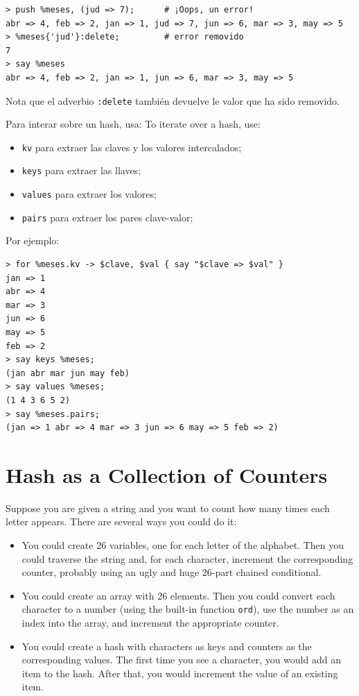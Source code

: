 \begin{verbatim}
> push %meses, (jud => 7);      # ¡Oops, un error!
abr => 4, feb => 2, jan => 1, jud => 7, jun => 6, mar => 3, may => 5
> %meses{'jud'}:delete;         # error removido
7
> say %meses
abr => 4, feb => 2, jan => 1, jun => 6, mar => 3, may => 5
\end{verbatim}

Nota que el adverbio {\tt :delete} también devuelve le valor que
ha sido removido.

Para interar sobre un hash, usa:
To iterate over a hash, use:

\begin{itemize}
\item {\tt kv} para extraer las claves y los valores intercalados;
\item {\tt keys} para extraer las llaves;
\item {\tt values} para extraer los valores;
\item {\tt pairs} para extraer los pares clave-valor;
\end{itemize}

Por ejemplo:

\begin{verbatim}
> for %meses.kv -> $clave, $val { say "$clave => $val" }
jan => 1
abr => 4
mar => 3
jun => 6
may => 5
feb => 2
> say keys %meses;
(jan abr mar jun may feb)
> say values %meses;
(1 4 3 6 5 2)
> say %meses.pairs;
(jan => 1 abr => 4 mar => 3 jun => 6 may => 5 feb => 2)
\end{verbatim}
%

\section{Hash as a Collection of Counters}
\label{histogram}

Suppose you are given a string and you want to count how many
times each letter appears.  There are several ways you could do it:

\begin{itemize}

\item You could create 26 variables, one for each letter of the
alphabet.  Then you could traverse the string and, for each
character, increment the corresponding counter, probably using
an ugly and huge 26-part chained conditional.

\item You could create an array with 26 elements.  Then you could
convert each character to a number (using the built-in function
{\tt ord}), use the number as an index into the array, and 
increment the appropriate counter.

\item You could create a hash with characters as keys
and counters as the corresponding values.  The first time you
see a character, you would add an item to the hash.  After
that, you would increment the value of an existing item.

\end{itemize}

